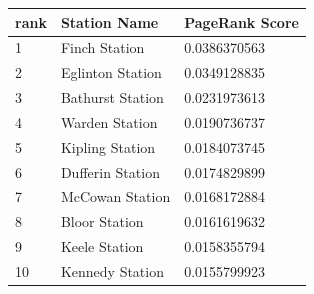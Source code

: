 \begin{tabular}{l l l}
\toprule
rank & Station Name & PageRank Score \\
\midrule
1 & Finch Station & 0.0386370563 \\
2 & Eglinton Station & 0.0349128835 \\
3 & Bathurst Station & 0.0231973613 \\
4 & Warden Station & 0.0190736737 \\
5 & Kipling Station & 0.0184073745 \\
6 & Dufferin Station & 0.0174829899 \\
7 & McCowan Station & 0.0168172884 \\
8 & Bloor Station & 0.0161619632 \\
9 & Keele Station & 0.0158355794 \\
10 & Kennedy Station & 0.0155799923 \\
\bottomrule
\end{tabular}
